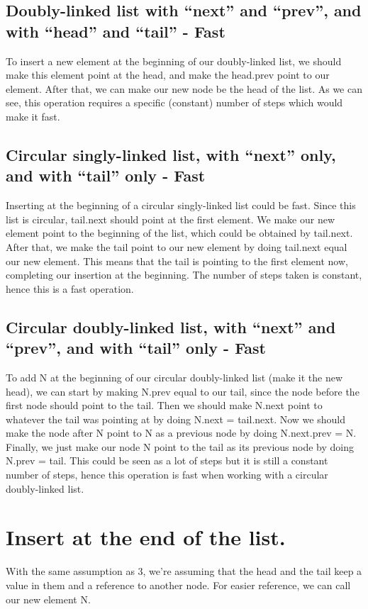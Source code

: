 \documentclass{article}
\begin{document}
\subsection{Doubly-linked list with “next” and “prev”, and with “head” and “tail” - Fast}
To insert a new element at the beginning of our doubly-linked list, we should make this element point at the head, and make the head.prev point to our element. After that, we can make our new node be the head of the list. As we can see, this operation requires a specific (constant) number of steps which would make it fast.

\subsection{Circular singly-linked list, with “next” only, and with “tail” only - Fast}
Inserting at the beginning of a circular singly-linked list could be fast. Since this list is circular, tail.next should point at the first element. We make our new element point to the beginning of the list, which could be obtained by tail.next. After that, we make the tail point to our new element by doing tail.next equal our new element. This means that the tail is pointing to the first element now, completing our insertion at the beginning. The number of steps taken is constant, hence this is a fast operation.

\subsection{Circular doubly-linked list, with “next” and “prev”, and with “tail” only - Fast}
To add N at the beginning of our circular doubly-linked list (make it the new head), we can start by making N.prev equal to our tail, since the node before the first node should point to the tail. Then we should make N.next point to whatever the tail was pointing at by doing N.next = tail.next. Now we should make the node after N point to N as a previous node by doing N.next.prev = N. Finally, we just make our node N point to the tail as its previous node by doing N.prev = tail. This could be seen as a lot of steps but it is still a constant number of steps, hence this operation is fast when working with a circular doubly-linked list.



\section{Insert at the end of the list.}
With the same assumption as 3, we're assuming that the head and the tail keep a value in them and a reference to another node. For easier reference, we can call our new element N.
\end{document}
